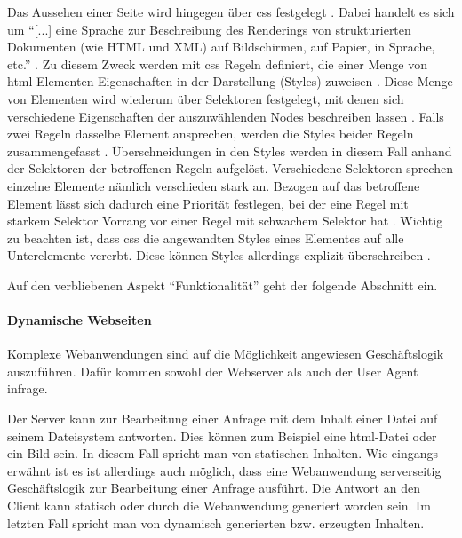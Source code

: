             Das Aussehen einer Seite wird hingegen über \gls{css} festgelegt \cite{w3c:css}.
            Dabei handelt es sich um "`[...] eine Sprache zur Beschreibung des Renderings
            von strukturierten Dokumenten (wie HTML und XML) auf Bildschirmen, auf Papier,
            in Sprache, etc."' \cite{w3c:css}.
            Zu diesem Zweck werden mit \gls{css} Regeln definiert,
            die einer Menge von \gls{html}-Elementen Eigenschaften in der Darstellung (Styles) zuweisen
            \cite{w3c:cssSyntax}.
            Diese Menge von Elementen wird wiederum über Selektoren festgelegt,
            mit denen sich verschiedene Eigenschaften der auszuwählenden Nodes beschreiben lassen
            \cite{w3c:cssSelectors}.
            Falls zwei Regeln dasselbe Element ansprechen,
            werden die Styles beider Regeln zusammengefasst
            \cite{w3c:cssCascading}.
            Überschneidungen in den Styles werden in diesem Fall anhand der Selektoren der betroffenen Regeln aufgelöst.
            Verschiedene Selektoren sprechen einzelne Elemente nämlich verschieden stark an.
            Bezogen auf das betroffene Element lässt sich dadurch eine Priorität festlegen,
            bei der eine Regel mit starkem Selektor Vorrang vor einer Regel mit schwachem Selektor hat
            \cite{w3c:cssSelectors}. 
            Wichtig zu beachten ist, dass \gls{css} die angewandten Styles eines Elementes auf alle Unterelemente vererbt.
            Diese können Styles allerdings explizit überschreiben
            \cite{w3c:cssCascading}.
            
            Auf den verbliebenen Aspekt "`Funktionalität"' geht der folgende Abschnitt ein.

            \paragraph*{Dynamische Webseiten}
            Komplexe Webanwendungen sind auf die Möglichkeit angewiesen Geschäftslogik auszuführen.
            Dafür kommen sowohl der Webserver als auch der User Agent infrage.

            Der Server kann zur Bearbeitung einer Anfrage mit dem Inhalt einer Datei auf seinem Dateisystem antworten.
            Dies können zum Beispiel eine \gls{html}-Datei oder ein Bild sein.
            In diesem Fall spricht man von statischen Inhalten.
            Wie eingangs erwähnt ist es ist allerdings auch möglich,
            dass eine Webanwendung serverseitig Geschäftslogik zur Bearbeitung einer Anfrage ausführt.
            Die Antwort an den Client kann statisch oder
            durch die Webanwendung generiert worden sein.
            Im letzten Fall spricht man von dynamisch generierten bzw. erzeugten Inhalten.

